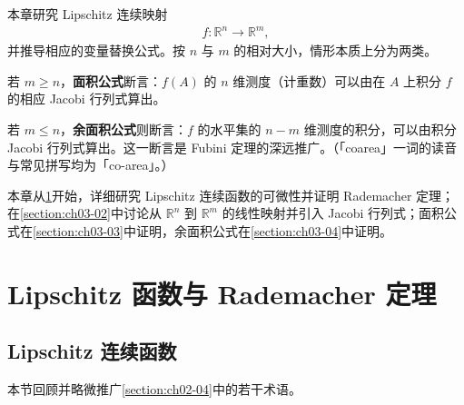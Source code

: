 \documentclass[../../main.tex]{subfiles}%
\begin{document}
本章研究 Lipschitz 连续映射
\begin{align*}
f:\mathbb{R}^n\to\mathbb{R}^m,
\end{align*}
并推导相应的变量替换公式。按 $n$ 与 $m$ 的相对大小，情形本质上分为两类。

若 $m\geqslant n$，\textbf{面积公式}断言：$f(A)$ 的 $n$ 维测度（计重数）可以由在 $A$ 上积分 $f$ 的相应 Jacobi 行列式算出。

若 $m\leqslant n$，\textbf{余面积公式}则断言：$f$ 的水平集的 $n-m$ 维测度的积分，可以由积分 Jacobi 行列式算出。这一断言是 Fubini 定理的深远推广。（「coarea」一词的读音与常见拼写均为「co-area」。）

本章从\cref{section:ch03-01}开始，详细研究 Lipschitz 连续函数的可微性并证明 Rademacher 定理；在\cref{section:ch03-02}中讨论从 $\mathbb{R}^n$ 到 $\mathbb{R}^m$ 的线性映射并引入 Jacobi 行列式；面积公式在\cref{section:ch03-03}中证明，余面积公式在\cref{section:ch03-04}中证明。%

\section{Lipschitz 函数与 Rademacher 定理}\label{section:ch03-01}

\subsection{Lipschitz 连续函数}\label{subsection:ch03-01-1}

本节回顾并略微推广\cref{section:ch02-04}中的若干术语。%
\end{document}
